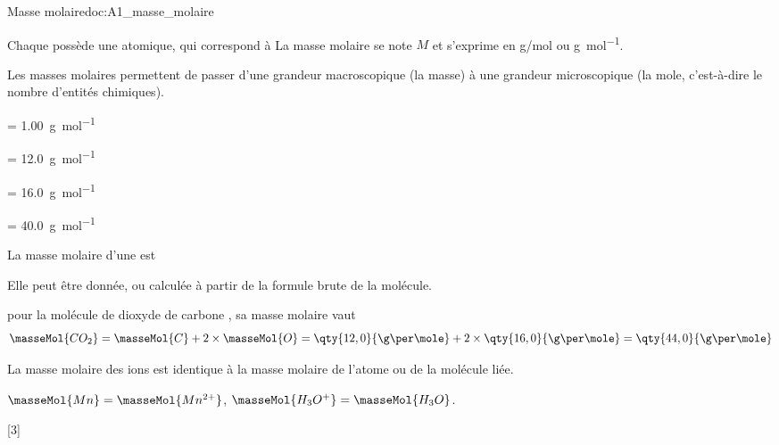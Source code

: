 \newpage
\vspace*{-36pt}
\begin{doc}{Masse molaire}{doc:A1_masse_molaire}
  \begin{importants}
    Chaque  possède une  atomique, qui correspond à 
    La masse molaire se note $M$ et s'exprime en \unit{\g/\mole} ou \unit{\g\per\mole}.
  \end{importants}
  Les masses molaires permettent de passer d'une grandeur macroscopique (la masse) à une grandeur microscopique (la mole, c'est-à-dire le nombre d'entités chimiques).

  \begin{donnees}
    \item {}  = \qty{1,00}{\g\per\mole}
    \item {}  = \qty{12,0}{\g\per\mole}
    \item {}  = \qty{16,0}{\g\per\mole}
    \item {} = \qty{40,0}{\g\per\mole}
  \end{donnees}

  \begin{importants}
    La masse molaire d'une  est 
  \end{importants}
  Elle peut être donnée, ou calculée à partir de la formule brute de la molécule.

  \exemple pour la molécule de dioxyde de carbone \dioxydeDeCarbone, sa masse molaire vaut
  \begin{equation*}
    \masseMol{CO_2} = \masseMol{C} + 2 \times \masseMol{O}
    = \qty{12,0}{\g\per\mole} + 2\times\qty{16,0}{\g\per\mole}
    = \qty{44,0}{\g\per\mole}
  \end{equation*}

  \begin{importants}
    La masse molaire des ions est identique à la masse molaire de l'atome ou de la molécule liée.
  \end{importants}

  \exemples $\masseMol{Mn} = \masseMol{Mn^{2+}}$,
  $\masseMol{H_3O^{+}} = \masseMol{H_3O}$.
\end{doc}

[3]


